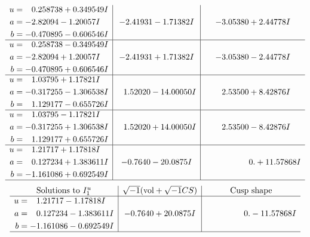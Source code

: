 \documentclass[1p]{elsarticle_modified}
\theoremstyle{definition}
\newcommand{\I}{\sqrt{-1}}
\begin{document}
$$\begin{array}{c|c|c}
\begin{aligned}
u &= \phantom{-}0.258738 + 0.349549 I \\
a &= -2.82094 - 1.20057 I \\
b &= -0.470895 - 0.606546 I\end{aligned}
 & -2.41931 - 1.71382 I & -3.05380 + 2.44778 I \\ \hline\begin{aligned}
u &= \phantom{-}0.258738 - 0.349549 I \\
a &= -2.82094 + 1.20057 I \\
b &= -0.470895 + 0.606546 I\end{aligned}
 & -2.41931 + 1.71382 I & -3.05380 - 2.44778 I \\ \hline\begin{aligned}
u &= \phantom{-}1.03795 + 1.17821 I \\
a &= -0.317255 - 1.306538 I \\
b &= \phantom{-}1.129177 - 0.655726 I\end{aligned}
 & \phantom{-}1.52020 - 14.00050 I & \phantom{-}2.53500 + 8.42876 I \\ \hline\begin{aligned}
u &= \phantom{-}1.03795 - 1.17821 I \\
a &= -0.317255 + 1.306538 I \\
b &= \phantom{-}1.129177 + 0.655726 I\end{aligned}
 & \phantom{-}1.52020 + 14.00050 I & \phantom{-}2.53500 - 8.42876 I \\ \hline\begin{aligned}
u &= \phantom{-}1.21717 + 1.17818 I \\
a &= \phantom{-}0.127234 + 1.383611 I \\
b &= -1.161086 + 0.692549 I\end{aligned}
 & -0.7640 - 20.0875 I & \phantom{-0.000000 -}0. + 11.57868 I\\
 \hline 
 \end{array}$$\newpage$$\begin{array}{c|c|c}  
\text{Solutions to }I^u_{1}& \I (\text{vol} + \sqrt{-1}CS) & \text{Cusp shape}\\
 \hline 
\begin{aligned}
u &= \phantom{-}1.21717 - 1.17818 I \\
a &= \phantom{-}0.127234 - 1.383611 I \\
b &= -1.161086 - 0.692549 I\end{aligned}
 & -0.7640 + 20.0875 I & \phantom{-0.000000 } 0. - 11.57868 I\\
 \hline 
 \end{array}$$\newpage\newpage\renewcommand{\arraystretch}{1}
\end{document}
